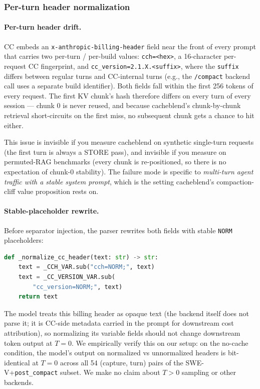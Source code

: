 \subsubsection{Per-turn header normalization}
\label{sec:header-norm}

\paragraph{Per-turn header drift.} CC embeds an
\texttt{x-anthropic-billing-header} field near the front of every
prompt that carries two per-turn / per-build values:
\texttt{cch=<hex>}, a 16-character per-request CC fingerprint, and
\texttt{cc\_version=2.1.X.<suffix>}, where the \texttt{suffix} differs
between regular turns and CC-internal turns (e.g., the
\texttt{/compact} backend call uses a separate build identifier).
Both fields fall within the first 256 tokens of every request. The
first KV chunk's hash therefore differs on every turn of every
session --- chunk 0 is never reused, and because cacheblend's
chunk-by-chunk retrieval short-circuits on the first miss, no
subsequent chunk gets a chance to hit either.

This issue is invisible if you measure cacheblend on synthetic
single-turn requests (the first turn is always a STORE pass), and
invisible if you measure on permuted-RAG benchmarks (every chunk is
re-positioned, so there is no expectation of chunk-0 stability). The
failure mode is specific to \emph{multi-turn agent traffic with a
stable system prompt}, which is the setting cacheblend's
compaction-cliff value proposition rests on.

\paragraph{Stable-placeholder rewrite.}
Before separator injection, the parser rewrites both fields with
stable \texttt{NORM} placeholders:

\begin{lstlisting}[basicstyle=\ttfamily\footnotesize, breaklines=true, frame=single, framesep=4pt, language=Python]
def _normalize_cc_header(text: str) -> str:
    text = _CCH_VAR.sub("cch=NORM;", text)
    text = _CC_VERSION_VAR.sub(
        "cc_version=NORM;", text)
    return text
\end{lstlisting}

The model treats this billing header as opaque text (the backend
itself does not parse it; it is CC-side metadata carried in the
prompt for downstream cost attribution), so normalizing its
variable fields should not change downstream token output at $T{=}0$.
We empirically verify this on our setup: on the no-cache condition,
the model's output on normalized vs unnormalized headers is
bit-identical at $T{=}0$ across all 54 (capture, turn) pairs of the
SWE-V+\texttt{post\_compact} subset. We make no claim about
$T{>}0$ sampling or other backends.


